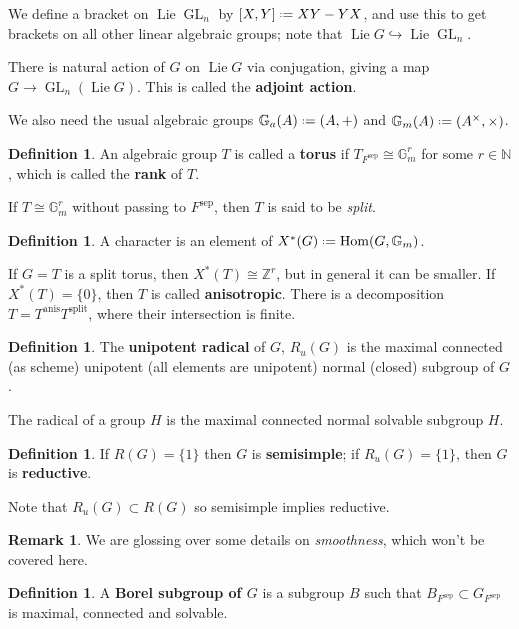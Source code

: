 \documentclass[11pt]{report}
\let\mbb\mathbb
\newcommand{\1}{\mathbbm 1}
\newcommand{\N}{\mathbb{N}}
\newcommand{\Z}{\mathbb{Z}}
\newcommand{\G}{\mbb G}
\newcommand*{\defeq}{\mathrel{\vcenter{\baselineskip0.5ex \lineskiplimit0pt
      \hbox{\scriptsize.}\hbox{\scriptsize.}}}%
  =}
\DeclareMathOperator{\sep}{sep}
\DeclareMathOperator{\Lie}{Lie}
\DeclareMathOperator{\GL}{GL}
\DeclareMathOperator{\Hom}{Hom}
\theoremstyle{plain}
\newcounter{ex}
\theoremstyle{definition}
\newtheorem{mydef}[thm]{Definition}
\newtheorem{remark}[thm]{Remark}
\theoremstyle{remark}
\numberwithin{equation}{section}
\begin{document}
We define a bracket on $\Lie \GL_{n}$ by $[X,Y] \defeq XY - YX$, and
use this to get brackets on all other linear algebraic groups; note
that $\Lie G \hookrightarrow \Lie \GL_{n}$.

There is natural action of $G$ on $\Lie G$ via conjugation, giving a
map $G \to \GL_{n}(\Lie G)$. This is called the \textbf{adjoint action}. 

We also need the usual algebraic groups $\mbb G_{a}(A) \defeq (A,+)$
and $\mbb G_{m}(A) \defeq (A^{\times},\times)$.
\begin{mydef}
  An algebraic group $T$ is called a \textbf{torus} if $T_{F^{\sep}} \cong
  \G_{m}^{r}$ for some $r \in \N$, which is called the \textbf{rank} of
  $T$.

  If $T \cong \G_{m}^{r}$ without passing to $F^{\sep}$, then $T$ is said
  to be \emph{split}.
\end{mydef}

\begin{mydef}
A character is an element of $X^{*}(G) \defeq \Hom(G,\mbb G_{m})$. 
\end{mydef}
If $G= T$ is a split torus, then $X^{*}(T) \cong \Z^{r}$, but in general
it can be smaller. If $X^{*}(T) = \{0\}$, then $T$ is called
\textbf{anisotropic}.  There is a decomposition
$T = T^{\mathrm{anis}} T^{\mathrm{split}}$, where their intersection
is finite.

\begin{mydef}
  The \textbf{unipotent radical} of $G$, $R_{u}(G)$ is the maximal
  connected (as scheme) unipotent (all elements are unipotent) normal
  (closed) subgroup of $G$. 
\end{mydef}
The radical of a group $H$ is the maximal connected normal solvable
subgroup $H$.

\begin{mydef}
  If $R(G) = \{1\}$ then $G$ is \textbf{semisimple}; if $R_{u}(G)=\{1\}$,
  then $G$ is \textbf{reductive}.
\end{mydef}
Note that $R_{u}(G) \subset R(G)$ so semisimple implies reductive.

\begin{remark}
  We are glossing over some details on \emph{smoothness}, which won't
  be covered here.
\end{remark}
\begin{mydef}
  A \textbf{Borel subgroup of $G$}  is a subgroup $B$ such that
  $B_{F^{\sep}} \subset G_{F^{\sep}}$ is maximal, connected and solvable.
\end{mydef}
\end{document}
